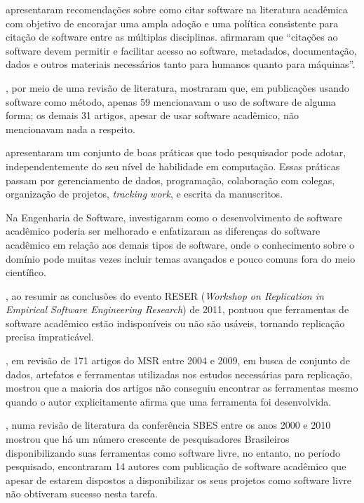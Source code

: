  apresentaram recomendações sobre como citar software
na literatura acadêmica com objetivo de encorajar uma ampla adoção e uma
política consistente para citação de software entre as múltiplas disciplinas.
%
 afirmaram que ``citações ao software devem
permitir e facilitar acesso ao software, metadados, documentação, dados e
outros materiais necessários tanto para humanos quanto para máquinas''.

,
por meio de uma  revisão de literatura, mostraram que,
em  publicações usando software como
método, apenas 59 mencionavam o uso de software de alguma forma;
os demais 31 artigos, apesar de usar software acadêmico, não mencionavam nada a
respeito.

 apresentaram um conjunto de boas práticas que todo
pesquisador pode adotar, independentemente do seu nível de habilidade em
computação. Essas práticas passam por gerenciamento de dados, programação,
colaboração com colegas, organização de projetos, {\it tracking work}, e escrita da
manuscritos.


Na Engenharia de Software, 
investigaram como o desenvolvimento de software acadêmico poderia ser melhorado e
enfatizaram as diferenças do software acadêmico em relação aos demais tipos de
software, onde o conhecimento sobre o domínio pode muitas vezes incluir temas
avançados e pouco comuns fora do meio científico.

,
ao resumir as conclusões do evento RESER ({\it Workshop on Replication in Empirical
Software Engineering Research}) de 2011, pontuou que ferramentas de software
acadêmico estão indisponíveis ou não são usáveis, tornando
replicação precisa impraticável.

, em revisão de 171 artigos do MSR entre 2004 e 2009,
em busca de conjunto de dados, artefatos e ferramentas utilizadas nos estudos
necessárias para replicação, mostrou que a maioria dos artigos não conseguiu encontrar
as ferramentas mesmo quando o autor explicitamente afirma que uma ferramenta foi desenvolvida.

, numa revisão de literatura da conferência SBES entre
os anos 2000 e 2010 mostrou que há um número crescente de pesquisadores
Brasileiros disponibilizando suas ferramentas como software livre, no entanto,
no período pesquisado, encontraram 14 autores com publicação de software acadêmico
que apesar de estarem dispostos a disponibilizar os seus projetos como software
livre não obtiveram sucesso nesta tarefa.

